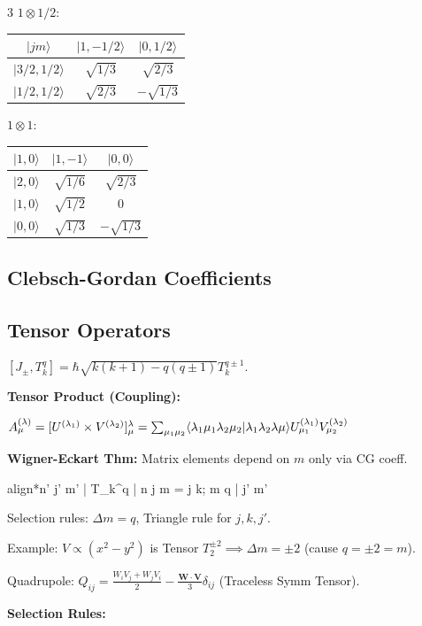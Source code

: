 \documentclass[10pt,a4paper]{article}
\newcommand{\important}[1]{\begin{empheq}[box=\fbox]{align*}#1\end{empheq}}
\begin{document}
\begin{multicols*}{3}
$1 \otimes 1/2$:
\begin{tabular}{|c|cc|}
\hline
$|jm\rangle$ & $|1, -1/2\rangle$ & $|0, 1/2\rangle$ \\
\hline
$|3/2, 1/2\rangle$ & $\sqrt{1/3}$ & $\sqrt{2/3}$ \\
$|1/2, 1/2\rangle$ & $\sqrt{2/3}$ & $-\sqrt{1/3}$ \\
\hline
\end{tabular}
$1 \otimes 1$:
\begin{tabular}{|c|cc|}
\hline
$|1, 0\rangle$ & $|1, -1\rangle$ & $|0, 0\rangle$ \\
\hline
$|2, 0\rangle$ & $\sqrt{1/6}$ & $\sqrt{2/3}$ \\
$|1, 0\rangle$ & $\sqrt{1/2}$ & $0$ \\
$|0, 0\rangle$ & $\sqrt{1/3}$ & $-\sqrt{1/3}$ \\
\hline
\end{tabular}

\subsection*{Clebsch-Gordan Coefficients}
\subsection*{Tensor Operators}

$[J_\pm, T_k^q] = \hbar \sqrt{k(k+1)-q(q\pm 1)} T_k^{q\pm 1}$.

\textbf{Tensor Product (Coupling):}

$A_\mu^{(\lambda)} = [U^{(\lambda_1)} \times V^{(\lambda_2)}]_\mu^\lambda = \sum_{\mu_1 \mu_2} \langle \lambda_1 \mu_1 \lambda_2 \mu_2 | \lambda_1 \lambda_2 \lambda \mu \rangle U_{\mu_1}^{(\lambda_1)} V_{\mu_2}^{(\lambda_2)} \\$

\textbf{Wigner-Eckart Thm:} Matrix elements depend on $m$ only via CG coeff.
\important{\langle n' j' m' | T_k^q | n j m \rangle = \langle j k; m q | j' m' \rangle \frac{\langle n' j' || T_k || n j \rangle}{\sqrt{2j'+1}}}

Selection rules: $\Delta m = q$, Triangle rule for $j, k, j'$.

Example: $V \propto (x^2-y^2)$ is Tensor $T_2^{\pm 2} \implies \Delta m = \pm 2$ (cause $q=\pm2=m$).

Quadrupole: $Q_{ij} = \frac{W_i V_j + W_j V_i}{2} - \frac{\mathbf{W}\cdot\mathbf{V}}{3}\delta_{ij}$ (Traceless Symm Tensor).

\textbf{Selection Rules:} 


\end{multicols*}
\end{document}
